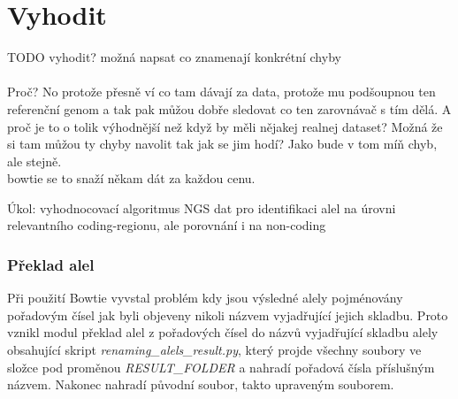 \documentclass[czech,DP]{thesiskiv}
\numberwithin{equation}{section}
\begin{document}
\chapter{Vyhodit}
TODO vyhodit?
možná napsat co znamenají konkrétní chyby
\\
\\
Proč? No protože přesně ví co tam dávají za data, protože mu podšoupnou ten referenční genom a tak pak můžou dobře sledovat co ten zarovnávač s tím dělá. 
A proč je to o tolik výhodnější než když by měli nějakej realnej dataset? 
Možná že si tam můžou ty chyby navolit tak jak se jim hodí?
Jako bude v tom míň chyb, ale stejně.
\\

 bowtie se to snaží někam dát za každou cenu.


Úkol: vyhodnocovací algoritmus NGS dat pro identifikaci alel na úrovni relevantního coding-regionu, ale porovnání i na non-coding


\subsection{Překlad alel}
Při použití Bowtie vyvstal problém kdy jsou výsledné alely pojménovány pořadovým čísel jak byli objeveny nikoli názvem vyjadřující jejich skladbu. Proto vznikl modul překlad alel z pořadových čísel do názvů vyjadřující skladbu alely obsahující skript \textit{renaming\_alels\_result.py}, který projde všechny soubory ve složce pod proměnou \textit{RESULT\_FOLDER} a nahradí pořadová čísla příslušným názvem. Nakonec nahradí původní soubor, takto upraveným souborem.
\end{document}
